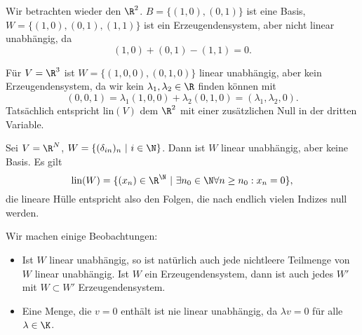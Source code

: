 \documentclass[letterpaper,10pt,english]{jupyterBook}
\begin{document}
\label{vektorraeume/vektorraeume:example-6}
\begin{example}{}{}



Wir betrachten wieder den \(\R^2\). \(B=\{(1,0),(0,1)\}\) ist eine Basis, \(W= \{(1,0),(0,1),(1,1)\}\) ist ein Erzeugendensystem, aber nicht linear unabhängig, da
\begin{equation*}
 (1,0) + (0,1) - (1,1) = 0.
\end{equation*}\end{example}
\label{vektorraeume/vektorraeume:example-7}
\begin{example}{}{}



Für \(V=\R^3\) ist \(W=\{(1,0,0),(0,1,0)\}\)  linear unabhängig, aber kein Erzeugendensystem, da wir kein \(\lambda_1,\lambda_2 \in \R\) finden können mit
\begin{equation*}
(0,0,1) =  \lambda_1 (1,0,0)+ \lambda_2 (0,1,0) = (\lambda_1,\lambda_2,0).
\end{equation*}
Tatsächlich entspricht lin\((V)\) dem \(\R^2\) mit einer zusätzlichen Null in der dritten Variable.
\end{example}
\label{vektorraeume/vektorraeume:example-8}
\begin{example}{}{}



Sei \(V=\R^N\), \(W=\{(\delta_{in})_n ~|~i \in \N\}\). Dann ist \(W\) linear unabhängig, aber keine Basis. Es gilt
\begin{equation*}
 \text{lin}(W) = \{ (x_n) \in \R^\N~|~ \exists n_0 \in \N \forall n \geq n_0: x_n =0 \},
\end{equation*}
die lineare Hülle entspricht also den Folgen, die nach endlich vielen Indizes null werden.
\end{example}

Wir machen einige Beobachtungen:
\begin{itemize}
\item {} 
Ist \(W\) linear unabhängig, so ist natürlich auch jede nichtleere Teilmenge von \(W\) linear unabhängig. Ist \(W\) ein Erzeugendensystem, dann ist auch jedes \(W'\) mit \(W \subset W'\) Erzeugendensystem.

\item {} 
Eine Menge, die \(v=0\) enthält ist nie linear unabhängig, da \(\lambda   v  = 0\) für alle \(\lambda \in \K\).

\end{itemize}
\end{document}
